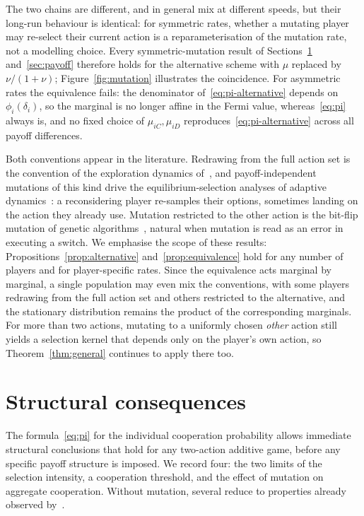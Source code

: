 \documentclass[11pt]{article}
\begin{document}
The two chains are different, and in general mix at different speeds, but
their long-run behaviour is identical: for symmetric rates, whether a
mutating player may re-select their current action is a reparameterisation
of the mutation rate, not a modelling choice. Every symmetric-mutation
result of Sections~\ref{sec:consequences} and~\ref{sec:payoff} therefore
holds for the alternative scheme with \(\mu\) replaced by \(\nu/(1+\nu)\);
Figure~\ref{fig:mutation} illustrates the coincidence. For asymmetric rates
the equivalence fails: the denominator of~\eqref{eq:pi-alternative} depends
on \(\phi_i(\delta_i)\), so the marginal is no longer affine in the Fermi
value, whereas~\eqref{eq:pi} always is, and no fixed choice of
\(\mu_{iC},\mu_{iD}\) reproduces~\eqref{eq:pi-alternative} across all payoff
differences.

Both conventions appear in the literature. Redrawing from the full action
set is the convention of the exploration dynamics
of~\cite{traulsen2009exploration}, and payoff-independent mutations of this
kind drive the equilibrium-selection analyses of adaptive
dynamics~\cite{kandori1993learning}: a reconsidering player re-samples their
options, sometimes landing on the action they already use. Mutation
restricted to the other action is the bit-flip mutation of genetic
algorithms~\cite{holland1992adaptation,goldberg1989genetic}, natural when
mutation is read as an error in executing a switch. We emphasise the scope
of these results: Propositions~\ref{prop:alternative}
and~\ref{prop:equivalence} hold for any number of players and for
player-specific rates. Since the equivalence acts marginal by marginal, a
single population may even mix the conventions, with some players redrawing
from the full action set and others restricted to the alternative, and the
stationary distribution remains the product of the corresponding marginals.
For more than two actions, mutating to a uniformly chosen \emph{other}
action still yields a selection kernel that depends only on the player's
own action, so Theorem~\ref{thm:general} continues to apply there too.

\section{Structural consequences}\label{sec:consequences}

The formula~\eqref{eq:pi} for the individual cooperation probability allows immediate
structural conclusions that hold for any two-action additive game, before any
specific payoff
structure is imposed. We record four: the two limits of the selection intensity, a
cooperation threshold, and the effect of mutation on aggregate cooperation. Without
mutation, several reduce to properties already observed
by~\cite{couto2023multiplayer}.
\end{document}
